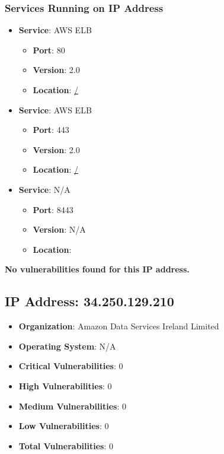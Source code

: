 \documentclass{article}
\begin{document}
\subsubsection*{Services Running on IP Address}

\begin{itemize}
    
        \item \textbf{Service}: AWS ELB
        \begin{itemize}
            \item \textbf{Port}: 80
            \item \textbf{Version}:  2.0 
            \item \textbf{Location}: \href{ / }{ / }
        \end{itemize}
    
        \item \textbf{Service}: AWS ELB
        \begin{itemize}
            \item \textbf{Port}: 443
            \item \textbf{Version}:  2.0 
            \item \textbf{Location}: \href{ / }{ / }
        \end{itemize}
    
        \item \textbf{Service}: N/A
        \begin{itemize}
            \item \textbf{Port}: 8443
            \item \textbf{Version}:  N/A 
            \item \textbf{Location}: \href{  }{  }
        \end{itemize}
    
\end{itemize}


\textbf{No vulnerabilities found for this IP address.}




\clearpage



\subsection*{IP Address: 34.250.129.210}

\begin{itemize}
    \item \textbf{Organization}: Amazon Data Services Ireland Limited
    \item \textbf{Operating System}:  N/A 
    \item \textbf{Critical Vulnerabilities}: 0
    \item \textbf{High Vulnerabilities}: 0
    \item \textbf{Medium Vulnerabilities}: 0
    \item \textbf{Low Vulnerabilities}: 0
    \item \textbf{Total Vulnerabilities}: 0
\end{itemize}
\end{document}
